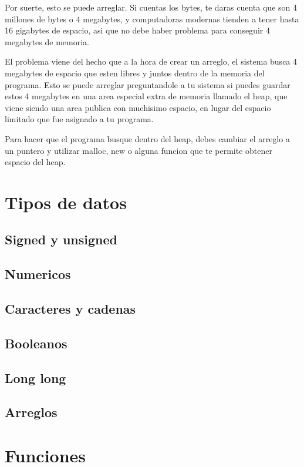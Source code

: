 \documentclass{article}
\begin{document}
Por suerte, esto se puede arreglar. Si cuentas los bytes, te daras cuenta que son 4 millones de bytes o 4 megabytes, y computadoras modernas tienden a tener hasta 16 gigabytes de espacio, asi que no debe haber problema para conseguir 4 megabytes de memoria.

El problema viene del hecho que a la hora de crear un arreglo, el sistema busca 4 megabytes de espacio que esten libres y juntos dentro de la memoria del programa. Esto se puede arreglar preguntandole a tu sistema si puedes guardar estos 4 megabytes en una area especial extra de memoria llamado el heap, que viene siendo una area publica con muchisimo espacio, en lugar del espacio limitado que fue asignado a tu programa.

Para hacer que el programa busque dentro del heap, debes cambiar el arreglo a un puntero y utilizar malloc, new o alguna funcion que te permite obtener espacio del heap.

\section{Tipos de datos}

\subsection{Signed y unsigned}

\subsection{Numericos}

\subsection{Caracteres y cadenas}

\subsection{Booleanos}

\subsection{Long long}

\subsection{Arreglos}

\section{Funciones}
\end{document}
